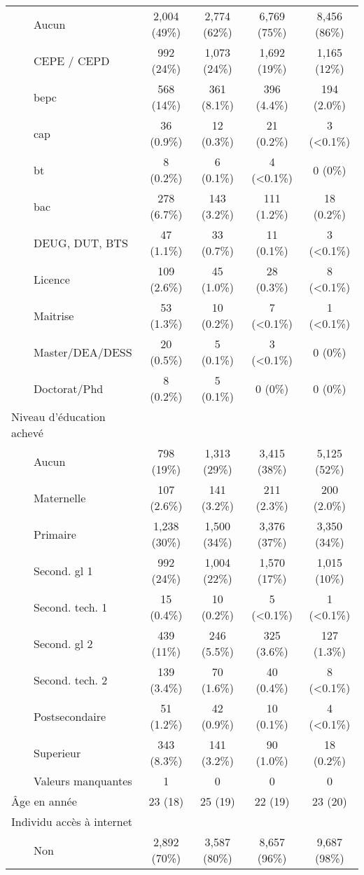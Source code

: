 \documentclass[
]{article}
\begin{document}
\begin{table}[!t]
\begin{tabular*}{\linewidth}{@{\extracolsep{\fill}}lcccc}
    Aucun & 2,004 (49\%) & 2,774 (62\%) & 6,769 (75\%) & 8,456 (86\%) \\ 
    CEPE / CEPD & 992 (24\%) & 1,073 (24\%) & 1,692 (19\%) & 1,165 (12\%) \\ 
    bepc & 568 (14\%) & 361 (8.1\%) & 396 (4.4\%) & 194 (2.0\%) \\ 
    cap & 36 (0.9\%) & 12 (0.3\%) & 21 (0.2\%) & 3 (<0.1\%) \\ 
    bt & 8 (0.2\%) & 6 (0.1\%) & 4 (<0.1\%) & 0 (0\%) \\ 
    bac & 278 (6.7\%) & 143 (3.2\%) & 111 (1.2\%) & 18 (0.2\%) \\ 
    DEUG, DUT, BTS & 47 (1.1\%) & 33 (0.7\%) & 11 (0.1\%) & 3 (<0.1\%) \\ 
    Licence & 109 (2.6\%) & 45 (1.0\%) & 28 (0.3\%) & 8 (<0.1\%) \\ 
    Maitrise & 53 (1.3\%) & 10 (0.2\%) & 7 (<0.1\%) & 1 (<0.1\%) \\ 
    Master/DEA/DESS & 20 (0.5\%) & 5 (0.1\%) & 3 (<0.1\%) & 0 (0\%) \\ 
    Doctorat/Phd & 8 (0.2\%) & 5 (0.1\%) & 0 (0\%) & 0 (0\%) \\ 
Niveau d'éducation achevé &  &  &  &  \\ 
    Aucun & 798 (19\%) & 1,313 (29\%) & 3,415 (38\%) & 5,125 (52\%) \\ 
    Maternelle & 107 (2.6\%) & 141 (3.2\%) & 211 (2.3\%) & 200 (2.0\%) \\ 
    Primaire & 1,238 (30\%) & 1,500 (34\%) & 3,376 (37\%) & 3,350 (34\%) \\ 
    Second. gl 1 & 992 (24\%) & 1,004 (22\%) & 1,570 (17\%) & 1,015 (10\%) \\ 
    Second. tech. 1 & 15 (0.4\%) & 10 (0.2\%) & 5 (<0.1\%) & 1 (<0.1\%) \\ 
    Second. gl 2 & 439 (11\%) & 246 (5.5\%) & 325 (3.6\%) & 127 (1.3\%) \\ 
    Second. tech. 2 & 139 (3.4\%) & 70 (1.6\%) & 40 (0.4\%) & 8 (<0.1\%) \\ 
    Postsecondaire & 51 (1.2\%) & 42 (0.9\%) & 10 (0.1\%) & 4 (<0.1\%) \\ 
    Superieur & 343 (8.3\%) & 141 (3.2\%) & 90 (1.0\%) & 18 (0.2\%) \\ 
    Valeurs manquantes & 1 & 0 & 0 & 0 \\ 
Âge en année & 23 (18) & 25 (19) & 22 (19) & 23 (20) \\ 
Individu accès à internet &  &  &  &  \\ 
    Non & 2,892 (70\%) & 3,587 (80\%) & 8,657 (96\%) & 9,687 (98\%) \\ 

\end{tabular*}
\end{table}
\end{document}

